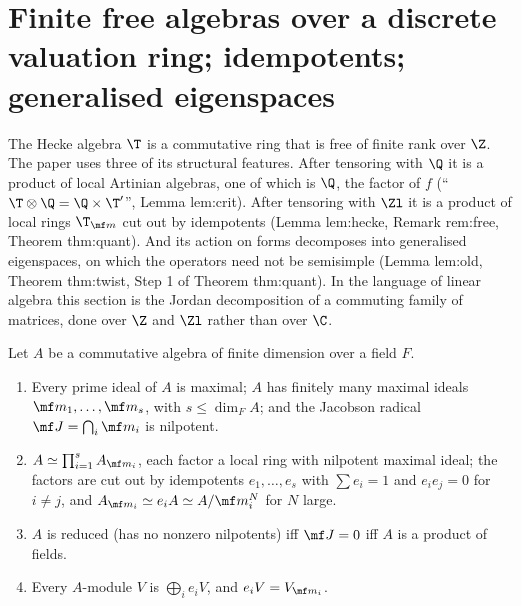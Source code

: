 \section[Finite free algebras and generalised eigenspaces]{Finite free algebras over a discrete valuation ring; idempotents; generalised eigenspaces}\label{sec:modules:algebras}

The Hecke algebra $\T$ is a commutative ring that is free of finite rank over $\Z$. The paper uses three of its structural features. After
tensoring with $\Q$ it is a product of local Artinian algebras, one of which is $\Q$, the factor of $f$ (``$\T\otimes\Q=\Q\times\T'$'', Lemma lem:crit).
After tensoring with $\Zl$ it is a product of local rings $\T_{\mf m}$ cut out by idempotents (Lemma lem:hecke, Remark rem:free, Theorem thm:quant).
And its action on forms decomposes into generalised eigenspaces, on which the operators need not be semisimple (Lemma lem:old, Theorem
thm:twist, Step 1 of Theorem thm:quant). In the language of linear algebra this section is the Jordan decomposition of a commuting family of
matrices, done over $\Z$ and $\Zl$ rather than over $\C$.

\begin{theorem}\label{thm:modules:artinian-algebras}
Let $A$ be a commutative algebra of finite dimension over a field $F$.
\begin{enumerate}[label=(\roman*)]
\item Every prime ideal of $A$ is maximal; $A$ has finitely many maximal ideals $\mf m_1,\dots,\mf m_s$, with $s\le\dim_FA$; and the Jacobson radical
$\mf J=\bigcap_i\mf m_i$ is nilpotent.
\item $A\simeq\prod_{i=1}^sA_{\mf m_i}$, each factor a local ring with nilpotent maximal ideal; the factors are cut out by idempotents $e_1,\dots,e_s$ with
$\sum e_i=1$ and $e_ie_j=0$ for $i\ne j$, and $A_{\mf m_i}\simeq e_iA\simeq A/\mf m_i^N$ for $N$ large.
\item $A$ is reduced (has no nonzero nilpotents) iff $\mf J=0$ iff $A$ is a product of fields.
\item Every $A$-module $V$ is $\bigoplus_ie_iV$, and $e_iV=V_{\mf m_i}$.
\end{enumerate}
\end{theorem}

